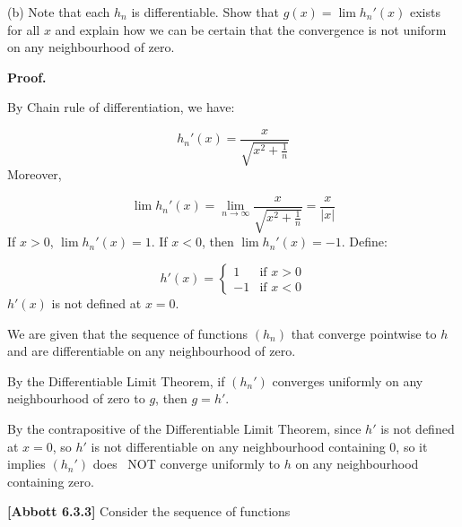 \documentclass[10pt]{article}
\begin{document}
(b) Note that each $\displaystyle h_{n}$ is differentiable. Show that $\displaystyle g( x) =\lim h_{n} '( x)$ exists for all $\displaystyle x$ and explain how we can be certain that the convergence is not uniform on any neighbourhood of zero.



\textbf{Proof.}



By Chain rule of differentiation, we have:


\begin{equation*}
h_{n} '( x) =\frac{x}{\sqrt{x^{2} +\frac{1}{n}}}
\end{equation*}
Moreover,


\begin{equation*}
\lim h_{n} '( x) =\lim _{n\rightarrow \infty }\frac{x}{\sqrt{x^{2} +\frac{1}{n}}} =\frac{x}{|x|}
\end{equation*}
If $\displaystyle x >0$, $\displaystyle \lim h_{n} '( x) =1$. If $\displaystyle x< 0$, then $\displaystyle \lim h_{n} '( x) =-1$. Define:


\begin{equation*}
h'( x) =\begin{cases}
1 & \text{if } x >0\\
-1 & \text{if } x< 0
\end{cases}
\end{equation*}
$\displaystyle h'( x)$ is not defined at $\displaystyle x=0$. 



We are given that the sequence of functions $\displaystyle ( h_{n})$ that converge pointwise to $\displaystyle h$ and are differentiable on any neighbourhood of zero. 



By the Differentiable Limit Theorem, if $\displaystyle ( h_{n} ')$ converges uniformly on any neighbourhood of zero to $\displaystyle g$, then $\displaystyle g=h'$.

 

By the contrapositive of the Differentiable Limit Theorem, since $\displaystyle h'$ is not defined at $\displaystyle x=0$, so $\displaystyle h'$ is not differentiable on any neighbourhood containing $\displaystyle 0$, so it implies $\displaystyle ( h_{n} ')$ does \ NOT converge uniformly to $\displaystyle h$ on any neighbourhood containing zero.



\textbf{[Abbott 6.3.3] }Consider the sequence of functions 
\end{document}
